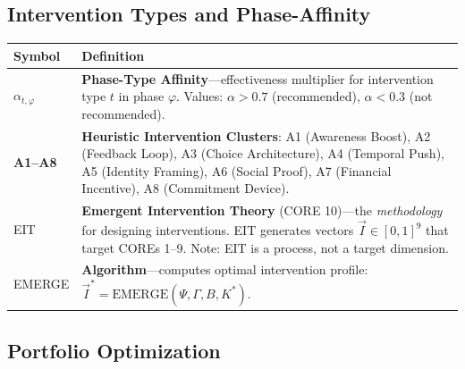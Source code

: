 \subsection{Intervention Types and Phase-Affinity}

\begin{longtable}{@{}p{2.8cm}p{10cm}@{}}
\toprule
\textbf{Symbol} & \textbf{Definition} \\
\midrule
\endhead
$\alpha_{t,\varphi}$ & \textbf{Phase-Type Affinity}---effectiveness multiplier for intervention type $t$ in phase $\varphi$. Values: $\alpha > 0.7$ (recommended), $\alpha < 0.3$ (not recommended). \\[6pt]
\textbf{A1--A8} & \textbf{Heuristic Intervention Clusters}: A1 (Awareness Boost), A2 (Feedback Loop), A3 (Choice Architecture), A4 (Temporal Push), A5 (Identity Framing), A6 (Social Proof), A7 (Financial Incentive), A8 (Commitment Device). \\[6pt]
EIT & \textbf{Emergent Intervention Theory} (CORE 10)---the \textit{methodology} for designing interventions. EIT generates vectors $\vec{I} \in [0,1]^9$ that target COREs 1--9. Note: EIT is a process, not a target dimension. \\[6pt]
EMERGE & \textbf{Algorithm}---computes optimal intervention profile: $\vec{I}^* = \text{EMERGE}(\Psi, \Gamma, B, K^*)$. \\
\bottomrule
\end{longtable}

\subsection{Portfolio Optimization}

